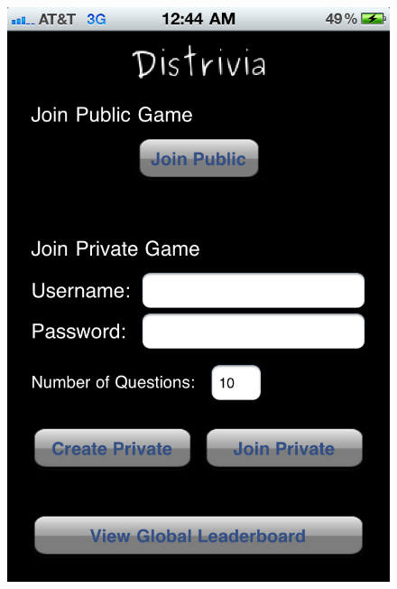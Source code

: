 \documentclass{dependencies/acm_proc_article-sp}
\begin{document}
\begin{figure}[h!]
   \includegraphics[scale=0.12]{iPhone_join.png}

\end{figure}
\end{document}
